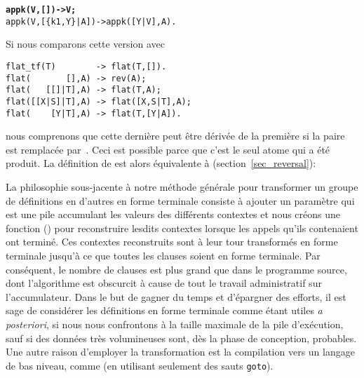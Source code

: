 \begin{enumerate}
\begin{alltt}
\textbf{appk(V,        []) -> V;}
appk(V,[\{k1,Y\}|A]) -> appk([Y|V],A).
\end{alltt}
Si nous comparons cette version avec
\begin{verbatim}
flat_tf(T)        -> flat(T,[]).
flat(       [],A) -> rev(A);
flat(   [[]|T],A) -> flat(T,A);
flat([[X|S]|T],A) -> flat([X,S|T],A);
flat(    [Y|T],A) -> flat(T,[Y|A]).
\end{verbatim}
nous comprenons que cette dernière peut être dérivée de la première si
la paire  est remplacée par~. Ceci est
possible parce que c'est le seul atome qui a été produit. La
définition de  est alors équivalente à
 (section~\vref{sec_reversal}):

\end{enumerate}
La philosophie sous-jacente à notre méthode générale pour transformer
un groupe de définitions en d'autres en forme terminale consiste à
ajouter un paramètre qui est une pile accumulant les valeurs des
différents contextes et nous créons une fonction ()
pour reconstruire lesdits contextes lorsque les appels qu'ils
contenaient ont terminé. Ces contextes reconstruits sont à leur tour
transformés en forme terminale jusqu'à ce que toutes les clauses
soient en forme terminale. Par conséquent, le nombre de clauses est
plus grand que dans le programme source, dont l'algorithme est
obscurcit à cause de tout le travail administratif sur l'accumulateur.
Dans le but de gagner du temps et d'épargner des efforts, il est sage
de considérer les définitions en forme terminale comme étant utiles
\emph{a posteriori}, si nous nous confrontons à la taille maximale de
la pile d'exécution, sauf si des données très volumineuses sont, dès
la phase de conception, probables. Une autre raison d'employer la
transformation est la compilation vers un langage de bas niveau, comme
\Clang (en utilisant seulement des sauts \texttt{goto}).

